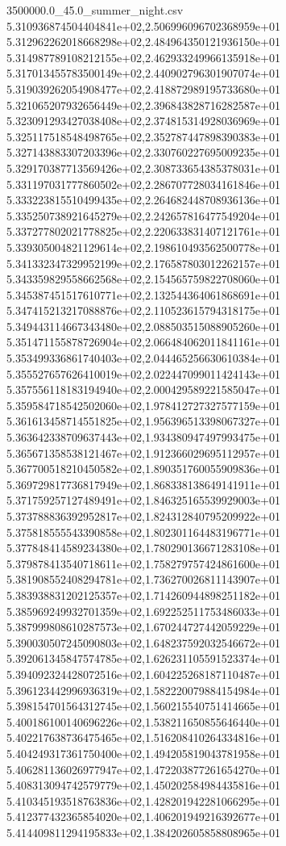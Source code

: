 \begin{filecontents*}{3500000.0_45.0_summer_night.csv}
5.310936874504404841e+02,2.506996096702368959e+01
5.312962262018668298e+02,2.484964350121936150e+01
5.314987789108212155e+02,2.462933249966135918e+01
5.317013455783500149e+02,2.440902796301907074e+01
5.319039262054908477e+02,2.418872989195733680e+01
5.321065207932656449e+02,2.396843828716282587e+01
5.323091293427038408e+02,2.374815314928036969e+01
5.325117518548498765e+02,2.352787447898390383e+01
5.327143883307203396e+02,2.330760227695009235e+01
5.329170387713569426e+02,2.308733654385378031e+01
5.331197031777860502e+02,2.286707728034161846e+01
5.333223815510499435e+02,2.264682448708936136e+01
5.335250738921645279e+02,2.242657816477549204e+01
5.337277802021778825e+02,2.220633831407121761e+01
5.339305004821129614e+02,2.198610493562500778e+01
5.341332347329952199e+02,2.176587803012262157e+01
5.343359829558662568e+02,2.154565759822708060e+01
5.345387451517610771e+02,2.132544364061868691e+01
5.347415213217088876e+02,2.110523615794318175e+01
5.349443114667343480e+02,2.088503515088905260e+01
5.351471155878726904e+02,2.066484062011841161e+01
5.353499336861740403e+02,2.044465256630610384e+01
5.355527657626410019e+02,2.022447099011424143e+01
5.357556118183194940e+02,2.000429589221585047e+01
5.359584718542502060e+02,1.978412727327577159e+01
5.361613458714551825e+02,1.956396513398067327e+01
5.363642338709637443e+02,1.934380947497993475e+01
5.365671358538121467e+02,1.912366029695112957e+01
5.367700518210450582e+02,1.890351760055909836e+01
5.369729817736817949e+02,1.868338138649141911e+01
5.371759257127489491e+02,1.846325165539929003e+01
5.373788836392952817e+02,1.824312840795209922e+01
5.375818555543390858e+02,1.802301164483196771e+01
5.377848414589234380e+02,1.780290136671283108e+01
5.379878413540718611e+02,1.758279757424861600e+01
5.381908552408294781e+02,1.736270026811143907e+01
5.383938831202125357e+02,1.714260944898251182e+01
5.385969249932701359e+02,1.692252511753486033e+01
5.387999808610287573e+02,1.670244727442059229e+01
5.390030507245090803e+02,1.648237592032546672e+01
5.392061345847574785e+02,1.626231105591523374e+01
5.394092324428072516e+02,1.604225268187110487e+01
5.396123442996936319e+02,1.582220079884154984e+01
5.398154701564312745e+02,1.560215540751414665e+01
5.400186100140696226e+02,1.538211650855646440e+01
5.402217638736475465e+02,1.516208410264334816e+01
5.404249317361750400e+02,1.494205819043781958e+01
5.406281136026977947e+02,1.472203877261654270e+01
5.408313094742579779e+02,1.450202584984435816e+01
5.410345193518763836e+02,1.428201942281066295e+01
5.412377432365854020e+02,1.406201949216392677e+01
5.414409811294195833e+02,1.384202605858808965e+01

\end{filecontents*}
